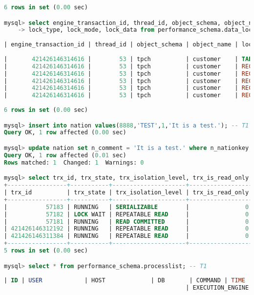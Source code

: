 \documentclass{article}
\begin{document}
\begin{lstlisting}[language=sql]
6 rows in set (0.00 sec)

mysql> select engine_transaction_id, thread_id, object_schema, object_name,
    -> lock_type, lock_mode, lock_data from performance_schema.data_locks; -- T1
    
| engine_transaction_id | thread_id | object_schema | object_name | lock_type | lock_mode | lock_data |
    
|       421426146314616 |        53 | tpch          | customer    | TABLE     | IS        | NULL      |
|       421426146314616 |        53 | tpch          | customer    | RECORD    | S         | 1         |
|       421426146314616 |        53 | tpch          | customer    | RECORD    | S         | 2         |
|       421426146314616 |        53 | tpch          | customer    | RECORD    | S         | 3         |
|       421426146314616 |        53 | tpch          | customer    | RECORD    | S         | 4         |
|       421426146314616 |        53 | tpch          | customer    | RECORD    | S         | 5         |
    
6 rows in set (0.00 sec)

mysql> insert into nation values(8888,'TEST',1,'It is a test.'); -- T1
Query OK, 1 row affected (0.00 sec)

mysql> update nation set n_comment = 'It is a test.' where n_nationkey = 0; -- T1
Query OK, 1 row affected (0.01 sec)
Rows matched: 1  Changed: 1  Warnings: 0

mysql> select trx_id, trx_state, trx_isolation_level, trx_is_read_only from information_schema.innodb_trx; -- T1
+-----------------+-----------+---------------------+------------------+
| trx_id          | trx_state | trx_isolation_level | trx_is_read_only |
+-----------------+-----------+---------------------+------------------+
|           57183 | RUNNING   | SERIALIZABLE        |                0 |
|           57182 | LOCK WAIT | REPEATABLE READ     |                0 |
|           57181 | RUNNING   | READ COMMITTED      |                0 |
| 421426146312192 | RUNNING   | REPEATABLE READ     |                0 |
| 421426146311384 | RUNNING   | REPEATABLE READ     |                0 |
+-----------------+-----------+---------------------+------------------+
5 rows in set (0.00 sec)

mysql> select * from performance_schema.processlist; -- T1
    
| ID | USER            | HOST             | DB       | COMMAND | TIME  | STATE                  | INFO
                                                    | EXECUTION_ENGINE |
    

\end{lstlisting}
\end{document}
